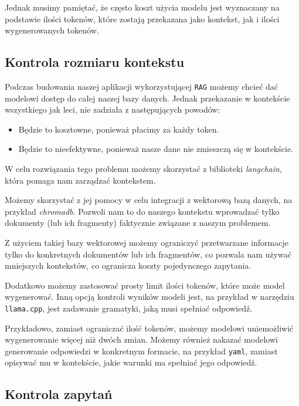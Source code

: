 \documentclass[12pt,a4paper]{article}
\begin{document}
Jednak musimy pamiętać, że często koszt użycia modelu jest wyznaczany na
podstawie ilości tokenów, które zostają przekazana jako kontekst, jak i ilości
wygenerowanych tokenów.

\subsection{Kontrola rozmiaru kontekstu}

Podczas budowania naszej aplikacji wykorzystującej \texttt{RAG} możemy chcieć
dać modelowi dostęp do całej naszej bazy danych. Jednak przekazanie w kontekście
wszystkiego jak leci, nie zadziała z następujących powodów:

\begin{itemize}
  \item Będzie to kosztowne, ponieważ płacimy za każdy token\cite{openaiapi}.
  \item Będzie to nieefektywne, ponieważ nasze dane nie zmieszczą się w
    kontekście.
\end{itemize}

W celu rozwiązania tego problemu możemy skorzystać z biblioteki
\emph{langchain}, która pomaga nam zarządzać kontekstem. 

Możemy skorzystać z jej pomocy w celu integracji z wektorową bazą danych, na
przykład \emph{chromadb}. Pozwoli nam to do naszego kontekstu wprowadzać tylko
dokumenty (lub ich fragmenty) faktycznie związane z naszym problemem.

Z użyciem takiej bazy wektorowej możemy ograniczyć przetwarzane informacje tylko
do konkretnych dokumentów lub ich fragmentów, co pozwala nam używać mniejszych
kontekstów, co ogranicza koszty pojedynczego zapytania.

Dodatkowo możemy zastosować prosty limit ilości tokenów, które może model
wygenerować. Inną opcją kontroli wyników modeli jest, na przykład w narzędziu
\texttt{llama.cpp}\cite{llamacpp}, jest zadawanie gramatyki, jaką musi spełniać odpowiedź.

Przykładowo, zamiast ograniczać ilość tokenów, możemy modelowi uniemożliwić
wygenerowanie więcej niż dwóch zmian. Możemy również nakazać modelowi
generowanie odpowiedzi w konkretnym formacie, na przykład \texttt{yaml}, zamiast
opisywać mu w kontekście, jakie warunki ma spełniać jego odpowiedź.

\subsection{Kontrola zapytań}
\end{document}

